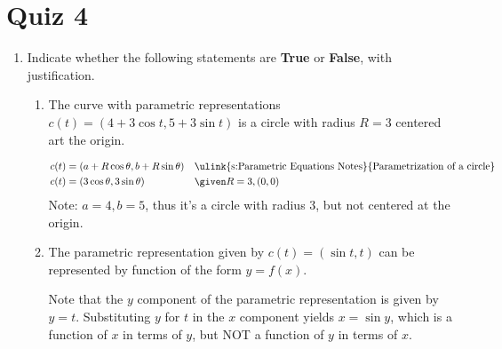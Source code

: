 \section{Quiz 4}
\begin{enumerate}
  \item Indicate whether the following statements are \textbf{True} or
    \textbf{False}, with justification.

  \begin{enumerate}[itemsep=22em]
    \item The curve with parametric representations \(c(t) = (4+3\cos t, 5 + 3
      \sin t)\) is a circle with radius \(R= 3\) centered art the origin.

      \begin{align*}
        c(t) &= (a + R \cos \theta, b + R \sin \theta)
        &&\text{\ulink{s:Parametric Equations Notes}{Parametrization of a circle}} \\
        c(t) &= (3 \cos \theta, 3\sin \theta)
        && \given R = 3, (0, 0)
      \end{align*}
      Note: \(a = 4, b = 5\), thus it's a circle with radius 3, but not centered at
      the origin.

    \vspace{-4em}
    \item The parametric representation given by \(c(t) = (\sin t, t)\) can be
      represented by function of the form \(y=f(x)\).


      Note that the \(y\) component of the parametric representation is given
      by \(y=t\). Substituting \(y\) for \(t\) in the \(x\) component yields
      \(x= \sin y\), which is a function of \(x\) in terms of \(y\), but NOT a
      function of \(y\) in terms of \(x\).
  \end{enumerate}


\end{enumerate}
